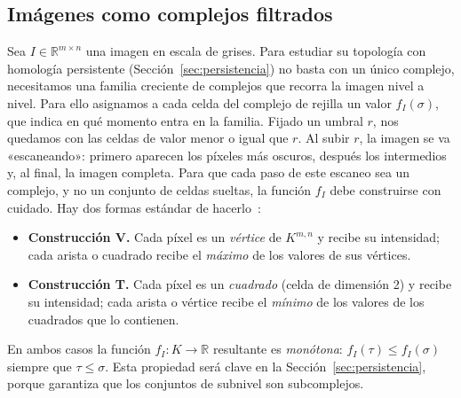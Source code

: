 \subsection{Imágenes como complejos filtrados}
\label{sec:imagenes-complejos}

Sea $I\in\mathbb{R}^{m\times n}$ una imagen en escala de grises. Para
estudiar su topología con homología persistente
(Sección~\ref{sec:persistencia}) no basta con un único complejo, necesitamos
una familia creciente de complejos que recorra la imagen nivel a nivel.
Para ello asignamos a cada celda del complejo de rejilla un valor
$f_I(\sigma)$, que indica en qué momento entra en la familia. Fijado un
umbral $r$, nos quedamos con las celdas de valor menor o igual que $r$. Al
subir $r$, la imagen se va «escaneando»: primero aparecen los píxeles más
oscuros, después los intermedios y, al final, la imagen completa. Para que
cada paso de este escaneo sea un complejo, y no un conjunto de celdas
sueltas, la función $f_I$ debe construirse con cuidado. Hay dos formas
estándar de hacerlo~\cite{stucki2023}:

\begin{itemize}
  \item \textbf{Construcción V.} Cada píxel es un \emph{vértice} de
  $K^{m,n}$ y recibe su intensidad; cada arista o cuadrado recibe el
  \emph{máximo} de los valores de sus vértices.
  \item \textbf{Construcción T.} Cada píxel es un \emph{cuadrado} (celda
  de dimensión 2) y recibe su intensidad; cada arista o vértice recibe el
  \emph{mínimo} de los valores de los cuadrados que lo contienen.
\end{itemize}

En ambos casos la función $f_I:K\to\mathbb{R}$ resultante es
\emph{monótona}: $f_I(\tau)\le f_I(\sigma)$ siempre que $\tau\le\sigma$.
Esta propiedad será clave en la Sección~\ref{sec:persistencia}, porque
garantiza que los conjuntos de subnivel son subcomplejos.

